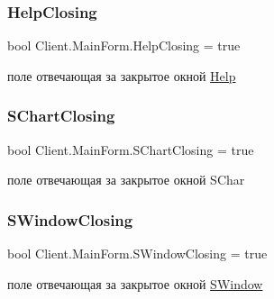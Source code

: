 \subsubsection{\texorpdfstring{Help\+Closing}{HelpClosing}}
{\footnotesize\ttfamily bool Client.\+Main\+Form.\+Help\+Closing = true\hspace{0.3cm}{\ttfamily [static]}}



поле отвечающая за закрытое окной \hyperlink{class_client_1_1_help}{Help} 

\hypertarget{class_client_1_1_main_form_aa9598c4369dac295d4c45455ca7133f4}{}\label{class_client_1_1_main_form_aa9598c4369dac295d4c45455ca7133f4} 
\subsubsection{\texorpdfstring{S\+Chart\+Closing}{SChartClosing}}
{\footnotesize\ttfamily bool Client.\+Main\+Form.\+S\+Chart\+Closing = true\hspace{0.3cm}{\ttfamily [static]}}



поле отвечающая за закрытое окной S\+Char 

\hypertarget{class_client_1_1_main_form_a623ae96ca11ba63ec5ecb191edf2fab0}{}\label{class_client_1_1_main_form_a623ae96ca11ba63ec5ecb191edf2fab0} 
\subsubsection{\texorpdfstring{S\+Window\+Closing}{SWindowClosing}}
{\footnotesize\ttfamily bool Client.\+Main\+Form.\+S\+Window\+Closing = true\hspace{0.3cm}{\ttfamily [static]}}



поле отвечающая за закрытое окной \hyperlink{class_client_1_1_s_window}{S\+Window} 

\hypertarget{class_client_1_1_main_form_af628f3dc899c945ef7347506f4c5612f}{}\label{class_client_1_1_main_form_af628f3dc899c945ef7347506f4c5612f} 
